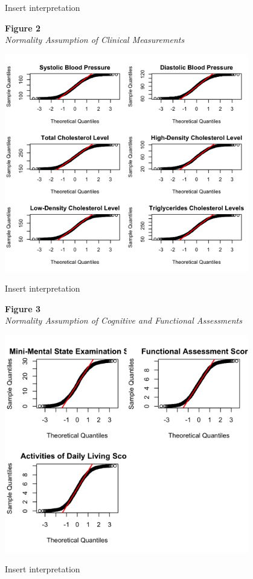 \documentclass[12pt]{article}
\begin{document}
Insert interpretation

\noindent
\textbf{Figure 2}\\
\textit{Normality Assumption of Clinical Measurements}
\begin{center}
    \includegraphics[width = 0.8\textwidth]{QQ_Clinical Measures.png}
\end{center}

Insert interpretation

\noindent
\textbf{Figure 3}\\
\textit{Normality Assumption of Cognitive and Functional Assessments}
\begin{center}
    \includegraphics[width = 0.8\textwidth]{QQ_Cog and Funcs.png}
\end{center}

Insert interpretation
\end{document}
